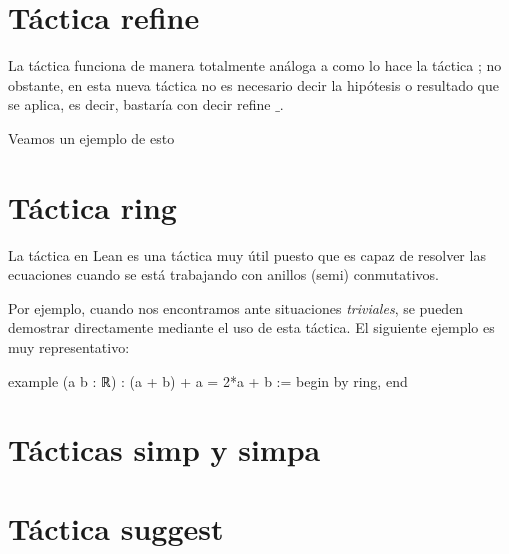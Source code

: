 \section{Táctica refine}
La táctica  funciona de manera totalmente análoga a como
lo hace la táctica ; no obstante, en esta nueva táctica no
es necesario decir la hipótesis o resultado que se aplica, es decir, bastaría
con decir refine \(\_\).

Veamos un ejemplo de esto

\section{Táctica ring}
La táctica  en Lean es una táctica muy útil puesto que es
capaz de resolver las ecuaciones cuando se está trabajando con anillos
(semi) conmutativos.

Por ejemplo, cuando nos encontramos ante situaciones \textit{triviales}, se
pueden demostrar directamente mediante el uso de esta táctica. El siguiente
ejemplo es muy representativo:

\begin{leancode}
example (a b : ℝ) : (a + b) + a = 2*a + b :=
begin
  by ring,
end
\end{leancode}

\section{Tácticas simp y simpa}


\section{Táctica suggest}

